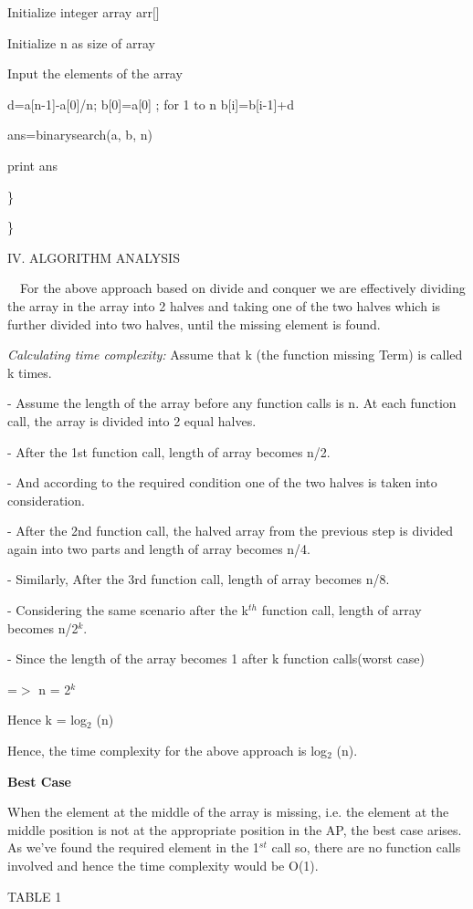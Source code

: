 \documentclass[12pt,a4paper]{article}
\begin{document}
\begin{multicols}{2}
\quad Initialize integer array arr$[$$]$

\quad  Initialize n as size of array

\quad Input the elements of the array 

\quad d=a[n-1]-a[0]/n;
\quad b[0]=a[0] ; 
\quad for 1 to n b[i]=b[i-1]+d

\quad ans=binarysearch(a, b, n)

\quad print ans

\}



\} 

\begin{center}IV. ALGORITHM ANALYSIS\end{center}


\ \ For the above approach based on divide and conquer we are effectively dividing the array in the array into 2 halves and taking one of the two halves which is further divided into two halves, until the missing element is found.
 

\textit{ Calculating time complexity: }Assume that k (the function missing Term) is called k times. 

-  Assume the length of the array before any function calls is n. At each function call, the array is divided into 2 equal halves.

- After the 1st function call, length of array becomes n/2.

- And according to the required condition one of the two halves is taken into consideration.

-  After the 2nd function call, the halved array from the previous step is divided again into two parts and length of array becomes n/4.

-  Similarly, After the 3rd function call, length of array becomes n/8.

-  Considering the same scenario after the k$^{th}$ function call, length of array becomes n/2$^{k}$.

-  Since the length of the array becomes 1 after k function calls(worst case) 

=$>$ n = 2$^{k}$

Hence k = log$_{2}$ (n)



Hence, the time complexity for the above approach is log$_{2}$
(n).

\textbf{Best Case }

When the element at the middle of the array is missing, i.e. the element at the middle position is not at the appropriate position in the AP, the best case arises. As we've found the required element in the 1$^{st}$ call so, there are no function calls involved and hence the time complexity would be O(1).


\end{multicols}
\begin{center}TABLE 1\end{center}
\end{document}
